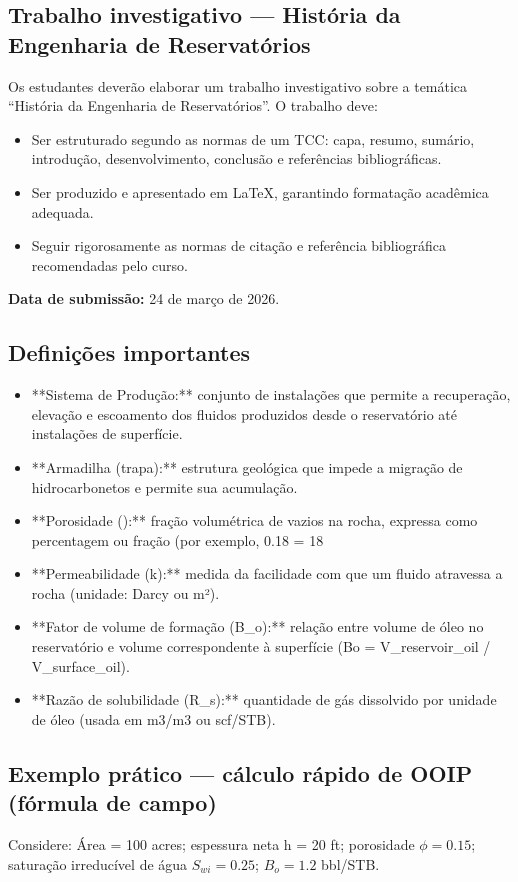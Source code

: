 \documentclass[11pt,a4paper]{article}
\begin{document}
\subsection{Trabalho investigativo — História da Engenharia de Reservatórios}
 Os estudantes deverão elaborar um trabalho investigativo sobre a temática “História da Engenharia de Reservatórios”. O trabalho deve:
\begin{itemize}
\item Ser estruturado segundo as normas de um TCC: capa, resumo, sumário, introdução, desenvolvimento, conclusão e referências bibliográficas.
\item Ser produzido e apresentado em LaTeX, garantindo formatação acadêmica adequada.
\item Seguir rigorosamente as normas de citação e referência bibliográfica recomendadas pelo curso.
\end{itemize}

 \textbf{Data de submissão:} 24 de março de 2026.

\subsection{Definições importantes}
\begin{itemize}
\item **Sistema de Produção:** conjunto de instalações que permite a recuperação, elevação e escoamento dos fluidos produzidos desde o reservatório até instalações de superfície.
\item **Armadilha (trapa):** estrutura geológica que impede a migração de hidrocarbonetos e permite sua acumulação.
\item **Porosidade (\phi):** fração volumétrica de vazios na rocha, expressa como percentagem ou fração (por exemplo, 0.18 = 18%
\item **Permeabilidade (k):** medida da facilidade com que um fluido atravessa a rocha (unidade: Darcy ou m²).
\item **Fator de volume de formação (B_o):** relação entre volume de óleo no reservatório e volume correspondente à superfície (Bo = V_reservoir_oil / V_surface_oil).
\item **Razão de solubilidade (R_s):** quantidade de gás dissolvido por unidade de óleo (usada em m3/m3 ou scf/STB).
\end{itemize}

\subsection{Exemplo prático — cálculo rápido de OOIP (fórmula de campo)}
Considere: Área = 100 acres; espessura neta h = 20 ft; porosidade \(\phi = 0.15\); saturação irreducível de água \(S_{wi}=0.25\); \(B_o = 1.2\) bbl/STB.
\end{document}
